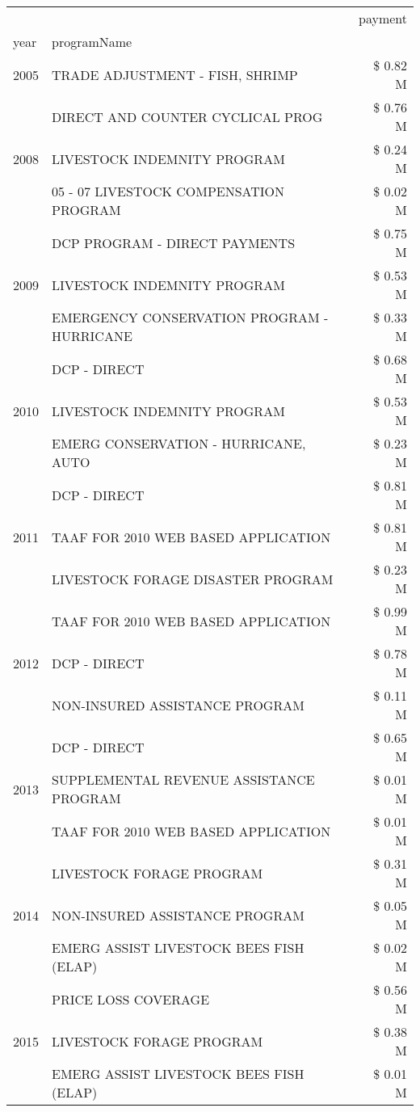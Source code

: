 \begin{tabular}{llr}
\toprule
 &  & payment \\
year & programName &  \\
\midrule
2005 & TRADE ADJUSTMENT - FISH, SHRIMP & \$ 0.82 M \\
\cline{1-3}
\multirow[t]{3}{*}{2008} & DIRECT AND COUNTER CYCLICAL PROG & \$ 0.76 M \\
 & LIVESTOCK INDEMNITY PROGRAM & \$ 0.24 M \\
 & 05 - 07 LIVESTOCK COMPENSATION PROGRAM & \$ 0.02 M \\
\cline{1-3}
\multirow[t]{3}{*}{2009} & DCP PROGRAM - DIRECT PAYMENTS & \$ 0.75 M \\
 & LIVESTOCK INDEMNITY PROGRAM & \$ 0.53 M \\
 & EMERGENCY CONSERVATION PROGRAM - HURRICANE & \$ 0.33 M \\
\cline{1-3}
\multirow[t]{3}{*}{2010} & DCP - DIRECT & \$ 0.68 M \\
 & LIVESTOCK INDEMNITY PROGRAM & \$ 0.53 M \\
 & EMERG CONSERVATION - HURRICANE, AUTO & \$ 0.23 M \\
\cline{1-3}
\multirow[t]{3}{*}{2011} & DCP - DIRECT & \$ 0.81 M \\
 & TAAF FOR 2010 WEB BASED APPLICATION & \$ 0.81 M \\
 & LIVESTOCK FORAGE DISASTER PROGRAM & \$ 0.23 M \\
\cline{1-3}
\multirow[t]{3}{*}{2012} & TAAF FOR 2010 WEB BASED APPLICATION & \$ 0.99 M \\
 & DCP - DIRECT & \$ 0.78 M \\
 & NON-INSURED ASSISTANCE PROGRAM & \$ 0.11 M \\
\cline{1-3}
\multirow[t]{3}{*}{2013} & DCP - DIRECT & \$ 0.65 M \\
 & SUPPLEMENTAL REVENUE ASSISTANCE PROGRAM & \$ 0.01 M \\
 & TAAF FOR 2010 WEB BASED APPLICATION & \$ 0.01 M \\
\cline{1-3}
\multirow[t]{3}{*}{2014} & LIVESTOCK FORAGE PROGRAM & \$ 0.31 M \\
 & NON-INSURED ASSISTANCE PROGRAM & \$ 0.05 M \\
 & EMERG ASSIST LIVESTOCK BEES FISH (ELAP) & \$ 0.02 M \\
\cline{1-3}
\multirow[t]{3}{*}{2015} & PRICE LOSS COVERAGE & \$ 0.56 M \\
 & LIVESTOCK FORAGE PROGRAM & \$ 0.38 M \\
 & EMERG ASSIST LIVESTOCK BEES FISH (ELAP) & \$ 0.01 M \\

\end{tabular}
